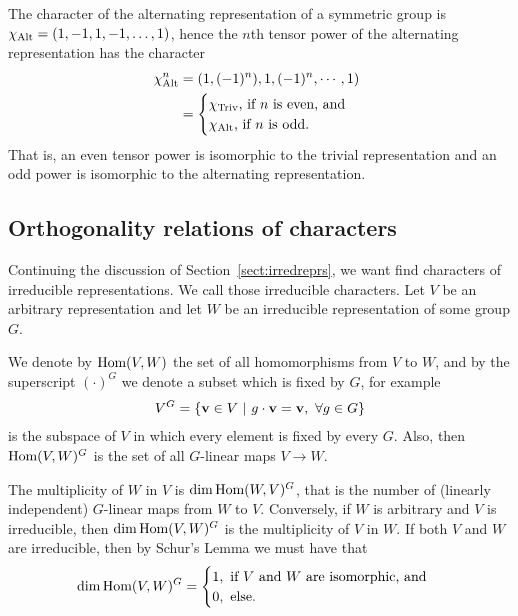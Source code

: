 \begin{example}\label{example:nthpoweralternating}
	The character of the alternating representation of a symmetric group is $\chi_{\text{Alt}} = (1, -1, 1, -1, \dots, 1)$, hence the $n$th tensor power of the alternating representation has the character
	\begin{align*}
		\chi_{\text{Alt}}^n &= (1, (-1)^n), 1, (-1)^n, \cdots, 1) \\
		&= \begin{cases}
			\chi_{\text{Triv}} \text{, if $n$ is even, and } \\
			\chi_{\text{Alt}} \text{, if $n$ is odd.}
		\end{cases}
	\end{align*}
	That is, an even tensor power is isomorphic to the trivial representation and an odd power is isomorphic to the alternating representation.
\end{example}

\subsection{Orthogonality relations of characters}

Continuing the discussion of Section~\ref{sect:irredreprs}, we want find characters of irreducible representations. We call those irreducible characters. Let $V$ be an arbitrary representation and let $W$ be an irreducible representation of some group $G$. 

We denote by $\text{Hom} (V,W)$ the set of all homomorphisms from $V$ to $W$, and by the superscript $(\cdot) ^G$ we denote a subset which is fixed by $G$, for example 
\begin{align}\label{eq:defVG}
	V^G = \left\lbrace \mathbf{v} \in V \ \middle\vert \ g\cdot \mathbf{v} = \mathbf{v}, \ \forall g \in G \right\rbrace
\end{align} 
is the subspace of $V$ in which every element is fixed by every $G$. Also, then $\text{Hom}(V,W)^G$ is the set of all $G$-linear maps $V \rightarrow W$.

\begin{proposition}
	The multiplicity of $W$ in $V$ is $\dim \text{Hom}(W,V)^G$, that is the number of (linearly independent) $G$-linear maps from $W$ to $V$. Conversely, if $W$ is arbitrary and $V$ is irreducible, then $\dim \text{Hom} (V,W)^G$ is the multiplicity of $V$ in $W$. If both $V$ and $W$ are irreducible, then by Schur's Lemma we must have that
	\begin{align}\label{eq:dimhomVWG}
		\dim \text{Hom} (V,W)^G = \begin{cases}
			1, \text{ if $V$ and $W$ are isomorphic, and} \\
			0, \text{ else.}
		\end{cases}
	\end{align}
\end{proposition}


